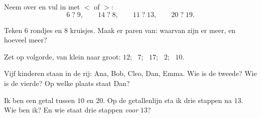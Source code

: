 \begin{exercise}[$\star$]\label{exo:g1:counting:5}
Neem over en vul in met $<$ of $>$:
\[
6 \;?\; 9, \qquad
14 \;?\; 8, \qquad
11 \;?\; 13, \qquad
20 \;?\; 19 .
\]
\end{exercise}

\begin{exercise}[$\star$]\label{exo:g1:counting:6}
Teken $6$ rondjes en $8$ kruisjes. Maak er paren van: waarvan zijn er
meer, en hoeveel meer?
\end{exercise}

\begin{exercise}[$\star$]\label{exo:g1:counting:7}
Zet op volgorde, van klein naar groot: $12$; \ $7$; \ $17$; \ $2$;
\ $10$.
\end{exercise}

\begin{exercise}[$\star$]\label{exo:g1:counting:8}
Vijf kinderen staan in de rij: Ana, Bob, Cleo, Dan, Emma. Wie is de
tweede? Wie is de vierde? Op welke plaats staat Dan?
\end{exercise}

\begin{exercise}[$\star\star$]\label{exo:g1:counting:9}
Ik ben een getal tussen $10$ en $20$. Op de getallenlijn sta ik drie
stappen na $13$. Wie ben ik? En wie staat drie stappen \emph{voor}
$13$?
\end{exercise}
